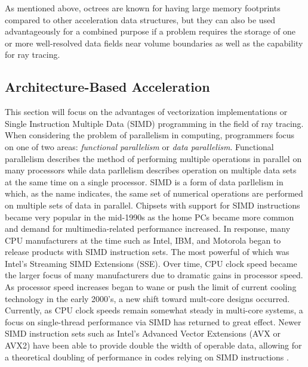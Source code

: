 As mentioned above, octrees are known for having large memory footprints
compared to other acceleration data structures, but they can also be used
advantageously for a combined purpose if a problem requires the storage of one
or more well-resolved data fields near volume boundaries as well as the
capability for ray tracing.

\subsection{Architecture-Based Acceleration}%
\label{subsec:arch}

This section will focus on the advantages of vectorization implementations or
Single Instruction Multiple Data (SIMD) programming in the field of ray
tracing. When considering the problem of parallelism in computing, programmers
focus on one of two areas: \textit{functional parallelism} or \textit{data
  parallelism}. Functional parallelism describes the method of performing
multiple operations in parallel on many processors while data parllelism
describes operation on multiple data sets at the same time on a single
processor. SIMD is a form of data parllelism in which, as the name indicates,
the same set of numerical operations are performed on multiple sets of data in
parallel. Chipsets with support for SIMD instructions became very popular in the
mid-1990s as the home PCs became more common and demand for multimedia-related
performance increased. In response, many CPU manufacturers at the time such as
Intel, IBM, and Motorola began to release products with SIMD instruction
sets. The most powerful of which was Intel's Streaming SIMD Extensions
(SSE). Over time, CPU clock speed became the larger focus of many manufacturers
due to dramatic gains in processor speed. As processor speed increases began to
wane or push the limit of current cooling technology in the early 2000's, a new
shift toward mult-core designs occurred. Currently, as CPU clock speeds remain
somewhat steady in multi-core systems, a focus on single-thread performance via
SIMD has returned to great effect. Newer SIMD instruction sets such as Intel's
Advanced Vector Extensions (AVX or AVX2) have been able to provide double the
width of operable data, allowing for a theoretical doubling of performance in codes
relying on SIMD instructions \cite{Hughes_2015}.

